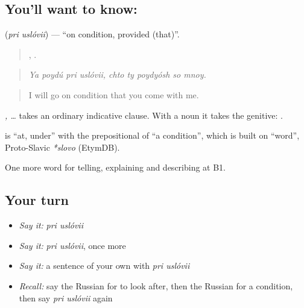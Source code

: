 \subsection*{You'll want to know:  }
\textbf{ } (\emph{pri uslóvii}) — \textquotedblleft{}on condition, provided (that)\textquotedblright{}.

\begin{quote}
   ,     .
\end{quote}

\begin{quote}
\emph{Ya poydú pri uslóvii, chto ty poydyósh so mnoy.}
\end{quote}

\begin{quote}
I will go on condition that you come with me.
\end{quote}

\emph{ , …} takes an ordinary indicative clause. With a noun it takes the genitive: \emph{  }.

\begin{cousinweb}
\textbf{ } is \emph{} \textquotedblleft{}at, under\textquotedblright{} with the prepositional of \emph{} \textquotedblleft{}a condition\textquotedblright{}, which is built on \emph{} \textquotedblleft{}word\textquotedblright{}, Proto-Slavic \emph{*slovo} (EtymDB).
\end{cousinweb}

\begin{grammarlens}[title={What you've built}]
One more word for telling, explaining and describing at B1.
\end{grammarlens}

\subsection*{Your turn}
\begin{itemize}
\raggedright
  \item \emph{Say it:} \emph{pri uslóvii}
  \item \emph{Say it:} \emph{pri uslóvii}, once more
  \item \emph{Say it:} a sentence of your own with \emph{pri uslóvii}
  \item \emph{Recall:} say the Russian for to look after, then the Russian for a condition, then say \emph{pri uslóvii} again
\end{itemize}

